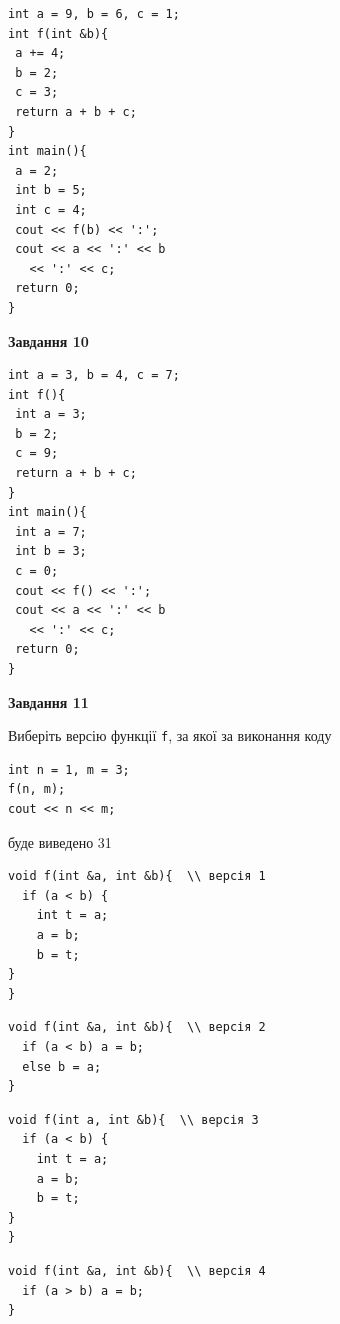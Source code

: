 \documentclass[12pt, ukrainian]{article}
\def\code#1{\Verb!#1!}
\begin{document}
{\begin {large}
\begin{minipage}[t]{7.0cm}
\begin{verbatim}
int a = 9, b = 6, c = 1;
int f(int &b){
 a += 4;
 b = 2;
 c = 3;
 return a + b + c;
}
int main(){
 a = 2;
 int b = 5;
 int c = 4;
 cout << f(b) << ':';
 cout << a << ':' << b 
   << ':' << c;
 return 0;
}
\end{verbatim}



\begin{center}
\textbf{Завдання 10}
\end{center}
\vspace{-8mm}

\begin{verbatim}
int a = 3, b = 4, c = 7;
int f(){
 int a = 3;
 b = 2;
 c = 9;
 return a + b + c;
}
int main(){
 int a = 7;
 int b = 3;
 c = 0;
 cout << f() << ':';
 cout << a << ':' << b 
   << ':' << c;
 return 0;
}
\end{verbatim}

\end{minipage}
\vline \hspace{1mm}
\begin{minipage}[t]{11.0cm}

\begin{center}
\textbf{Завдання 11}
\end{center}
Виберіть версію функції \code{f}, за якої за виконання коду
\begin{verbatim}
int n = 1, m = 3;
f(n, m);
cout << n << m;
\end{verbatim}

буде виведено 31

\begin{verbatim}
void f(int &a, int &b){  \\ версія 1
  if (a < b) {
    int t = a;
    a = b;
    b = t;
}  
}
\end{verbatim}

\vspace{-8mm}\begin{verbatim}
void f(int &a, int &b){  \\ версія 2
  if (a < b) a = b;
  else b = a;
}
\end{verbatim}

\vspace{-8mm}\begin{verbatim}
void f(int a, int &b){  \\ версія 3
  if (a < b) {
    int t = a;
    a = b;
    b = t;
}  
}
\end{verbatim}

\vspace{-8mm}\begin{verbatim}
void f(int &a, int &b){  \\ версія 4
  if (a > b) a = b;
}
\end{verbatim}




\end{minipage}
\end{large}}
\end{document}
